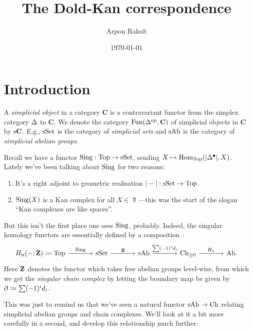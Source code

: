 


\title{The Dold-Kan correspondence}
\author{Arpon Raksit}
\date{\today}


\maketitle
\thispagestyle{fancy}


\renewcommand{\C}{\mathbf{C}}

\section{Introduction}

\begin{definition}
  A \textit{simplicial object} in a category $\C$ is a contravariant
  functor from the simplex category $\Delta$ to $\C$. We denote the
  category $\Fun(\Simplex^\op, \C)$ of simplicial objects in $\C$ by
  $\s\C$. E.g., $\mathrm{s}\mathrm{Set}$ is the category of \textit{simplicial sets}
  and $\mathrm{s}\mathrm{Ab}$ is the category of \textit{simplicial abelian groups}.
\end{definition}

Recall we have a functor $\operatorname{Sing} : \mathrm{Top} \to \mathrm{s}\mathrm{Set}$, sending $X \mapsto
\operatorname{Hom}_{\mathrm{Top}}(|\Delta^\bullet|, X)$. Lately we've been talking about
$\operatorname{Sing}$ for two reasons:
\begin{enumerate}
\item It's a right adjoint to geometric realisation $|-| : \mathrm{s}\mathrm{Set} \to
  \mathrm{Top}$.
\item $\operatorname{Sing}(X)$ is a Kan complex for all $X \in \Top$---this was the
  start of the slogan ``Kan complexes are like spaces''.
\end{enumerate}
But this isn't the first place one sees $\operatorname{Sing}$, probably. Indeed, the
singular homology functors are essentially defined by a composition
\[
\begin{tikzcd}[column sep = large]
  \H_n(-;\Z) \coloneqq \Top \rar{\Sing} & \s\Set \rar{\Z} & \s\Ab
  \rar{\sum (-1)^i d_i} & \Ch_{\ge 0} \rar{\H_n} & \Ab.
\end{tikzcd}
\]
Here $\mathbf{Z}$ denotes the functor which takes free abelian groups
level-wise, from which we get the \textit{singular chain complex} by
letting the boundary map be given by $\partial \coloneqq \sum (-1)^i d_i$.

This was just to remind us that we've seen a natural functor $\mathrm{s}\mathrm{Ab}
\to \mathrm{Ch}$ relating simplicial abelian groups and chain complexes. We'll
look at it a bit more carefully in a second, and develop this
relationship much further.

